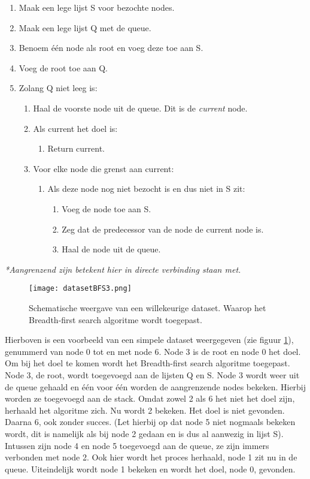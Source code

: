 \begin{enumerate}
\item Maak een lege lijst S voor bezochte nodes.
\item Maak een lege lijst Q met de queue.
\item Benoem \'e\'en node als root en voeg deze toe aan S.
\item Voeg de root toe aan Q. 
\item Zolang Q niet leeg is:
	\begin{enumerate}
	\item Haal de voorste node uit de queue. Dit is de \textit{current} node.
	\item Als current het doel is:
		\begin{enumerate}
		\item Return current.
		\end{enumerate}
	\item Voor elke node die grenst aan current:
		\begin{enumerate}
		\item Als deze node nog niet bezocht is en dus niet in S zit:
			\begin{enumerate}
			\item Voeg de node toe aan S.
			\item Zeg dat de predecessor van de node de current node is.
			\item Haal de node uit de queue.
			\end{enumerate}
		\end{enumerate}
	\end{enumerate}
\end{enumerate}

\textit{*Aangrenzend zijn betekent hier \textit{in directe verbinding staan met}.}

\begin{figure}[h]
  \centering
    \texttt{[image: datasetBFS3.png]}
  \caption{Schematische weergave van een willekeurige dataset. Waarop het Breadth-first search algoritme wordt toegepast.}
  \label{fig:datasetBFS3}
\end{figure}
Hierboven is een voorbeeld van een simpele dataset weergegeven (zie figuur \ref{fig:datasetBFS3}), genummerd van node 0 tot en met node 6. Node 3 is de root en node 0 het doel. Om bij het doel te komen wordt het Breadth-first search algoritme toegepast. Node 3, de root, wordt toegevoegd aan de lijsten Q en S. Node 3 wordt weer uit de queue gehaald en \'e\'en voor \'e\'en worden de aangrenzende nodes bekeken. Hierbij worden ze toegevoegd aan de stack. Omdat zowel 2 als 6 het niet het doel zijn, herhaald het algoritme zich. Nu wordt 2 bekeken. Het doel is niet gevonden. Daarna 6, ook zonder succes. (Let hierbij op dat node 5 niet nogmaals bekeken wordt, dit is namelijk als bij node 2 gedaan en is dus al aanwezig in lijst S). Intussen zijn node 4 en node 5 toegevoegd aan de queue, ze zijn immers verbonden met node 2. Ook hier wordt het proces herhaald, node 1 zit nu in de queue. Uiteindelijk wordt node 1 bekeken en wordt het doel, node 0, gevonden.

